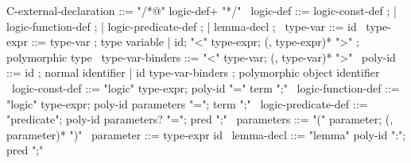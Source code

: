 \begin{syntax}
  C-external-declaration ::= "/*@" logic-def+ "*/"
  \
  logic-def ::= logic-const-def ;
          | logic-function-def ;
          | logic-predicate-def ;
          | lemma-decl ;
  \
  type-var ::= id
  \
  type-expr ::= type-var ; type variable
  | id;
    "<" type-expr;
    (, type-expr)* ">" ; polymorphic type
  \
  type-var-binders ::= "<" type-var;
                       (, type-var)* ">"
  \
  poly-id ::= id ; normal identifier
  | id type-var-binders ; polymorphic object identifier
  \
  logic-const-def ::= "logic" type-expr;
    poly-id "=" term ";"
  \
  logic-function-def ::= "logic" type-expr;
  poly-id parameters "=";
  term ";"
  \
  logic-predicate-def ::=
  "predicate";
  poly-id parameters? "=";
  pred ";"
  \
  parameters ::= "(" parameter;
                 (, parameter)* ")"
  \
  parameter ::= type-expr id
  \
  lemma-decl ::= "lemma" poly-id ":";
                   pred ";"
\end{syntax}